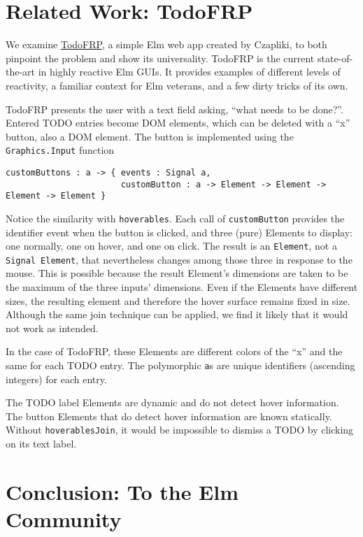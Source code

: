 \documentclass{article}
\begin{document}
\section{Related Work: TodoFRP}\label{related-work-todofrp}

We examine \href{https://github.com/evancz/TodoFRP}{TodoFRP}, a simple
Elm web app created by Czapliki, to both pinpoint the problem and show
its universality. TodoFRP is the current state-of-the-art in highly
reactive Elm GUIs. It provides examples of different levels of
reactivity, a familiar context for Elm veterans, and a few dirty tricks
of its own.

TodoFRP presents the user with a text field asking, ``what needs to be
done?''. Entered TODO entries become DOM elements, which can be deleted
with a ``x'' button, also a DOM element. The button is implemented using
the \texttt{Graphics.Input} function

\begin{verbatim}
customButtons : a -> { events : Signal a,
                       customButton : a -> Element -> Element -> Element -> Element }
\end{verbatim}

Notice the similarity with \texttt{hoverables}. Each call of
\texttt{customButton} provides the identifier event when the button is
clicked, and three (pure) Elements to display: one normally, one on
hover, and one on click. The result is an \texttt{Element}, not a
\texttt{Signal Element}, that nevertheless changes among those three in
response to the mouse. This is possible because the result Element's
dimensions are taken to be the maximum of the three inputs' dimensions.
Even if the Elements have different sizes, the resulting element and
therefore the hover surface remains fixed in size. Although the same
join technique can be applied, we find it likely that it would not work
as intended.

In the case of TodoFRP, these Elements are different colors of the ``x''
and the same for each TODO entry. The polymorphic \texttt{a}s are unique
identifiers (ascending integers) for each entry.

The TODO label Elements are dynamic and do not detect hover information.
The button Elements that do detect hover information are known
statically. Without \texttt{hoverablesJoin}, it would be impossible to
dismiss a TODO by clicking on its text label.

\section{Conclusion: To the Elm
Community}\label{conclusion-to-the-elm-community}
\end{document}
